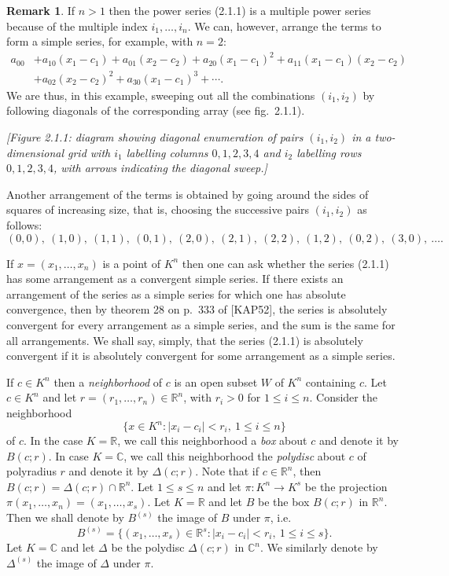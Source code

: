 \documentclass[11pt]{article}
\theoremstyle{plain}
\theoremstyle{definition}
\newtheorem*{remark}{Remark}
\newcommand{\R}{\mathbb{R}}
\newcommand{\C}{\mathbb{C}}
\begin{document}
\begin{remark}
If $n > 1$ then the power series (2.1.1) is a multiple power series
because of the multiple index $i_1, \ldots, i_n$. We can, however,
arrange the terms to form a simple series, for example, with $n = 2$:
\[
\begin{aligned}
a_{00} &+ a_{10}(x_1 - c_1) + a_{01}(x_2 - c_2) + a_{20}(x_1 - c_1)^2
+ a_{11}(x_1 - c_1)(x_2 - c_2) \\
&+ a_{02}(x_2 - c_2)^2 + a_{30}(x_1 - c_1)^3 + \cdots .
\end{aligned}
\]
We are thus, in this example, sweeping out all the combinations
$(i_1, i_2)$ by following diagonals of the corresponding array (see
fig.~2.1.1).
\end{remark}

\begin{center}
\textit{[Figure 2.1.1: diagram showing diagonal enumeration of pairs
$(i_1, i_2)$ in a two-dimensional grid with $i_1$ labelling columns
$0,1,2,3,4$ and $i_2$ labelling rows $0,1,2,3,4$, with arrows indicating
the diagonal sweep.]}
\end{center}

Another arrangement of the terms is obtained by going around the sides of
squares of increasing size, that is, choosing the successive pairs
$(i_1, i_2)$ as follows:
\[
(0,0),\ (1,0),\ (1,1),\ (0,1),\ (2,0),\ (2,1),\ (2,2),\ (1,2),\ (0,2),\
(3,0),\ \ldots .
\]

If $x = (x_1, \ldots, x_n)$ is a point of $K^n$ then one can ask whether
the series (2.1.1) has some arrangement as a convergent simple series. If
there exists an arrangement of the series as a simple series for which
one has absolute convergence, then by theorem 28 on p.~333 of [KAP52],
the series is absolutely convergent for every arrangement as a simple
series, and the sum is the same for all arrangements. We shall say,
simply, that the series (2.1.1) is absolutely convergent if it is
absolutely convergent for some arrangement as a simple series.

If $c \in K^n$ then a \emph{neighborhood} of $c$ is an open subset $W$ of
$K^n$ containing $c$. Let $c \in K^n$ and let
$r = (r_1, \ldots, r_n) \in \R^n$, with $r_i > 0$ for $1 \le i \le n$.
Consider the neighborhood
\[
\{ x \in K^n : |x_i - c_i| < r_i,\ 1 \le i \le n \}
\]
of $c$. In the case $K = \R$, we call this neighborhood a \emph{box} about
$c$ and denote it by $B(c;r)$. In case $K = \C$, we call this neighborhood
the \emph{polydisc} about $c$ of polyradius $r$ and denote it by
$\Delta(c;r)$. Note that if $c \in \R^n$, then
$B(c;r) = \Delta(c;r) \cap \R^n$. Let $1 \le s \le n$ and let
$\pi: K^n \to K^s$ be the projection
$\pi(x_1, \ldots, x_n) = (x_1, \ldots, x_s)$. Let $K = \R$ and let $B$ be
the box $B(c;r)$ in $\R^n$. Then we shall denote by $B^{(s)}$ the image
of $B$ under $\pi$, i.e.
\[
B^{(s)} = \{ (x_1, \ldots, x_s) \in \R^s : |x_i - c_i| < r_i,\
1 \le i \le s \}.
\]
Let $K = \C$ and let $\Delta$ be the polydisc $\Delta(c;r)$ in $\C^n$. We
similarly denote by $\Delta^{(s)}$ the image of $\Delta$ under $\pi$.
\end{document}

